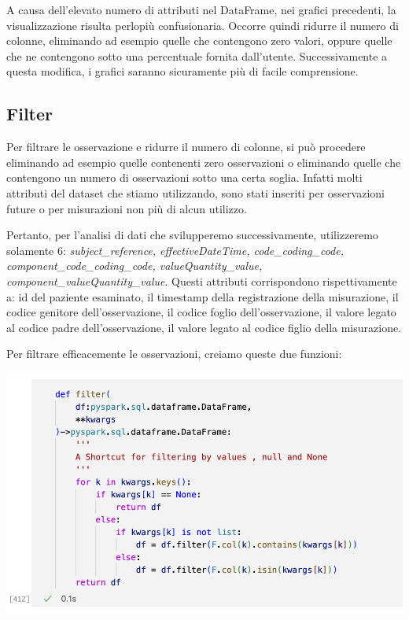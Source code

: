 \documentclass[11pt, oneside]{article}
\begin{document}
A causa dell'elevato numero di attributi nel DataFrame, nei grafici precedenti, la visualizzazione risulta perlopiù confusionaria. Occorre quindi ridurre il numero di colonne, eliminando ad esempio quelle che contengono zero valori, oppure quelle che ne contengono sotto una percentuale fornita dall'utente. Successivamente a questa modifica, i grafici saranno sicuramente più di facile comprensione.

\subsection{Filter}

Per filtrare le osservazione e ridurre il numero di colonne, si può procedere eliminando ad esempio quelle contenenti zero osservazioni o eliminando quelle che contengono un numero di osservazioni sotto una certa soglia. Infatti molti attributi del dataset che stiamo utilizzando, sono stati inseriti per osservazioni future o per misurazioni non più di alcun utilizzo.

Pertanto, per l'analisi di dati che svilupperemo successivamente, utilizzeremo solamente 6: \emph{subject\_reference, effectiveDateTime, code\_coding\_code, component\_code\_coding\_code, valueQuantity\_value, component\_valueQuantity\_value}. Questi attributi corrispondono rispettivamente a: id del paziente esaminato, il timestamp della registrazione della misurazione, il codice genitore dell'osservazione, il codice foglio dell'osservazione, il valore legato al codice padre dell'osservazione, il valore legato al codice figlio della misurazione.

Per filtrare efficacemente le osservazioni, creiamo queste due funzioni:

\begin{center}
\includegraphics[scale=0.45]{2_filter.png}
\end{center}
\end{document}
